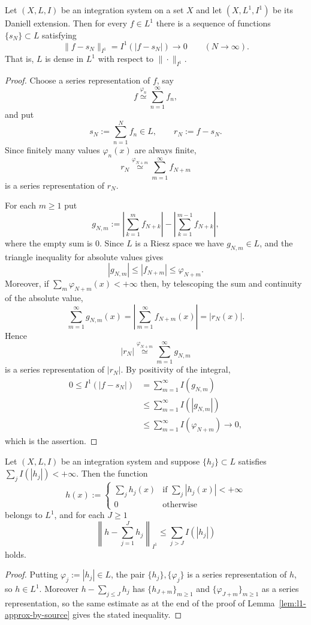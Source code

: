 \begin{lemma}\label{lem:l1-approx-by-source}
  Let $(X,L,I)$ be an integration system on a set $X$ and let
  $(X,L^1,I^1)$ be its Daniell extension.
  Then for every $f\in L^1$ there is a sequence of functions
  $\{s_N\}\subset L$ satisfying
  \[
    \|f-s_N\|_{I^1}=I^1(|f-s_N|)\longrightarrow0
    \qquad(N\to\infty) .
  \]
  That is, $L$ is dense in $L^1$ with respect to $\|\cdot\|_{I^1}$.
\end{lemma}
\begin{proof}
  Choose a series representation of $f$, say
  \[
    f\overset{\varphi_n}{\simeq}\sum_{n=1}^{\infty}f_n ,
  \]
  and put
  \[
    s_N:=\sum_{n=1}^Nf_n\in L,
    \qquad
    r_N:=f-s_N .
  \]
  Since finitely many values $\varphi_n(x)$ are always finite,
  \[
    r_N\overset{\varphi_{N+m}}{\simeq}
    \sum_{m=1}^{\infty}f_{N+m}
  \]
  is a series representation of $r_N$.

  For each $m\ge1$ put
  \[
    g_{N,m}:=
    \left|\sum_{k=1}^{m}f_{N+k}\right|
    -\left|\sum_{k=1}^{m-1}f_{N+k}\right| ,
  \]
  where the empty sum is $0$. Since $L$ is a Riesz space we have
  $g_{N,m}\in L$, and the triangle inequality for absolute values gives
  \[
    |g_{N,m}|\le |f_{N+m}|\le\varphi_{N+m} .
  \]
  Moreover, if $\sum_m\varphi_{N+m}(x)<+\infty$ then, by telescoping the sum and
  continuity of the absolute value,
  \[
    \sum_{m=1}^{\infty}g_{N,m}(x)
    =\left|\sum_{m=1}^{\infty}f_{N+m}(x)\right|
    =|r_N(x)| .
  \]
  Hence
  \[
    |r_N|\overset{\varphi_{N+m}}{\simeq}
    \sum_{m=1}^{\infty}g_{N,m}
  \]
  is a series representation of $|r_N|$. By positivity of the integral,
  \[
    \begin{aligned}
      0\le I^1(|f-s_N|)
      &=\sum_{m=1}^{\infty}I(g_{N,m})\\
      &\le\sum_{m=1}^{\infty}I(|g_{N,m}|)\\
      &\le\sum_{m=1}^{\infty}I(\varphi_{N+m})
      \longrightarrow0 ,
    \end{aligned}
  \]
  which is the assertion.
\end{proof}

\begin{corollary}\label{cor:tail-estimate}
  Let $(X,L,I)$ be an integration system and suppose $\{h_j\}\subset L$
  satisfies $\sum_j I(|h_j|)<+\infty$.
  Then the function
  \[
    h(x):=\begin{cases}
      \sum_j h_j(x) & \text{if $\sum_j|h_j(x)|<+\infty$}\\
      0 & \text{otherwise}
    \end{cases}
  \]
  belongs to $L^1$, and for each $J\ge1$
  \[
    \left\|h-\sum_{j=1}^{J}h_j\right\|_{I^1}\le\sum_{j>J}I(|h_j|)
  \]
  holds.
\end{corollary}
\begin{proof}
  Putting $\varphi_j:=|h_j|\in L$, the pair $\{h_j\},\{\varphi_j\}$ is a series
  representation of $h$, so $h\in L^1$.
  Moreover $h-\sum_{j\le J}h_j$ has $\{h_{J+m}\}_{m\ge1}$ and
  $\{\varphi_{J+m}\}_{m\ge1}$ as a series representation, so the same estimate
  as at the end of the proof of Lemma~\ref{lem:l1-approx-by-source} gives the
  stated inequality.
\end{proof}

